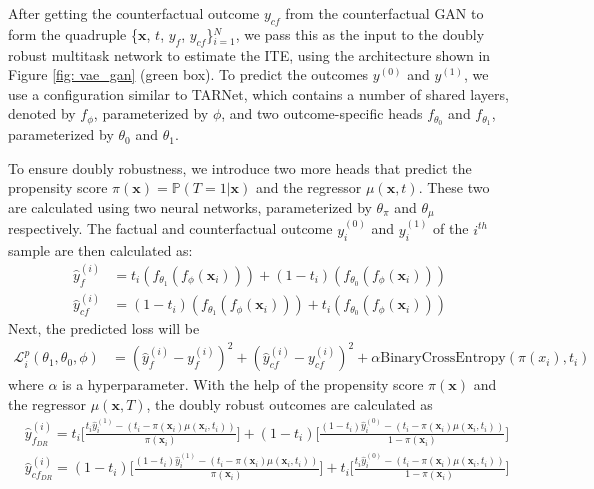 \documentclass{amia}
\begin{document}
After getting the counterfactual outcome $y_{cf}$ from the counterfactual GAN to form the quadruple \{$\textbf{x}$, $t$, $y_f$, $y_{cf}$\}$_{i=1}^N$, we pass this as the input to the doubly robust multitask network to estimate the ITE, using the architecture shown in Figure \ref{fig: vae_gan} (green box). To predict the outcomes $y^{(0)}$ and $y^{(1)}$, we use a configuration similar to TARNet,  which contains a number of shared layers, denoted by $f_\phi$, parameterized by $\phi$, and two outcome-specific heads $f_{\theta_0}$ and $f_{\theta_1}$, parameterized by $\theta_0$ and $\theta_1$.

To ensure doubly robustness, we introduce two more heads that predict the propensity score $\pi(\textbf{x}) = \mathbb{P}(T=1|\textbf{x})$ and the regressor $\mu(\textbf{x}, t)$. These two are calculated using two neural networks, parameterized by $\theta_\pi$ and $\theta_\mu$ respectively. 
The factual and counterfactual outcome $y^{(0)}_i$ and $y^{(1)}_i$ of the $i^{th}$ sample are then calculated as:
\begin{align}
    \hat{y}_f^{(i)} &= t_i(f_{\theta_1}(f_{\phi}(\textbf{x}_i))) + (1-t_i)(f_{\theta_0}(f_{\phi}(\textbf{x}_i))) \\
    \hat{y}_{cf}^{(i)} &= (1-t_i)(f_{\theta_1}(f_{\phi}(\textbf{x}_i))) + t_i(f_{\theta_0}(f_{\phi}(\textbf{x}_i)))
    \label{equ: pred_y}
\end{align}
Next, the predicted loss will be  
\begin{align}
    \mathcal{L}^p_i(\theta_1, \theta_0, \phi) &= (\hat{y}_f^{(i)} - y_f^{(i)})^2 + (\hat{y}_{cf}^{(i)} - y_{cf}^{(i)})^2 \nonumber
    + \alpha \text{BinaryCrossEntropy}(\pi(x_i), t_i)
    \label{equ: pred_loss}
\end{align}
 where $\alpha$ is a hyperparameter. With the help of the propensity score $\pi(\textbf{x})$ and the regressor $\mu(\textbf{x}, T)$, the doubly robust outcomes are calculated as 
\begin{align}
     &\hat{y}_{f_{DR}}^{(i)} = t_i\bigg[ \frac{t_i\hat{y}^{(1)}_i - (t_i - \pi(\textbf{x}_i)\mu(\textbf{x}_i, t_i))}{\pi(\textbf{x}_i)}\bigg] 
      + (1-t_i)\bigg[ \frac{(1-t_i)\hat{y}^{(0)}_i - (t_i - \pi(\textbf{x}_i)\mu(\textbf{x}_i, t_i))}{1- \pi(\textbf{x}_i)}\bigg] \\
     &\hat{y}_{{cf}_{DR}}^{(i)} = (1-t_i)\bigg[ \frac{(1-t_i)\hat{y}^{(1)}_i - (t_i - \pi(\textbf{x}_i)\mu(\textbf{x}_i, t_i))}{\pi(\textbf{x}_i)}\bigg] + t_i\bigg[ \frac{t_i\hat{y}^{(0)}_i - (t_i - \pi(\textbf{x}_i)\mu(\textbf{x}_i, t_i))}{1- \pi(\textbf{x}_i)}\bigg]
    \label{equ: outcome_DR}
\end{align}
\end{document}
